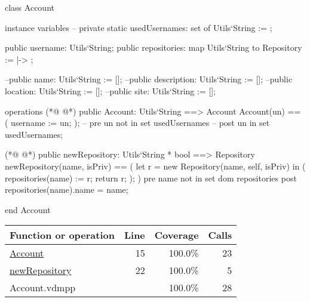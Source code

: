 \begin{vdmpp}[breaklines=true]
class Account

 instance variables
--  private static usedUsernames: set of Utils`String := {};
 
  public username: Utils`String;
  public repositories: map Utils`String to Repository := { |-> };
  
  --public name: Utils`String := [];
  --public description: Utils`String := [];
  --public location: Utils`String := [];
  --public site: Utils`String := [];
  
 operations
(*@
\label{Account:15}
@*)
  public Account: Utils`String ==> Account
  Account(un) == (
   username := un;
  );
--  pre un not in set usedUsernames
--  post un in set usedUsernames;
 
(*@
\label{newRepository:22}
@*)
  public newRepository: Utils`String * bool ==> Repository
  newRepository(name, isPriv) == (
   let r = new Repository(name, self, isPriv) in (
    repositories(name) := r;
    return r;
   );
  )
  pre name not in set dom repositories
  post repositories(name).name = name;

end Account
\end{vdmpp}
\bigskip
\begin{longtable}{|l|r|r|r|}
\hline
Function or operation & Line & Coverage & Calls \\
\hline
\hline
\hyperref[Account:15]{Account} & 15&100.0\% & 23 \\
\hline
\hyperref[newRepository:22]{newRepository} & 22&100.0\% & 5 \\
\hline
\hline
Account.vdmpp & & 100.0\% & 28 \\
\hline
\end{longtable}

